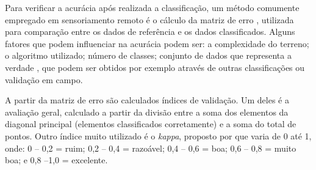 Para verificar a acurácia após realizada a classificação, um método
comumente empregado em sensoriamento remoto é o cálculo da matriz de erro \cite{lu-weng}, utilizada para comparação entre os dados de referência e os dados classificados. Alguns fatores que podem influenciar na acurácia
podem ser: a complexidade do terreno; o algoritmo utilizado; número de
classes; conjunto de dados que representa a verdade \cite{meneses2012introduccao}, que podem
ser obtidos por exemplo através de outras classificações ou validação em
campo.

A partir da matriz de erro são calculados índices de validação. Um
deles é a avaliação geral, calculado a partir da divisão entre a soma
dos elementos da diagonal principal (elementos classificados
corretamente) e a soma do total de pontos. Outro índice muito utilizado
é o \emph{kappa}, proposto por \cite{landis1977application} que varia de 0 até
1, onde: 0 -- 0,2 = ruim; 0,2 -- 0,4 = razoável; 0,4 -- 0,6 = boa; 0,6
-- 0,8 = muito boa; e 0,8 --1,0 = excelente. \cite{meneses2012introduccao}
